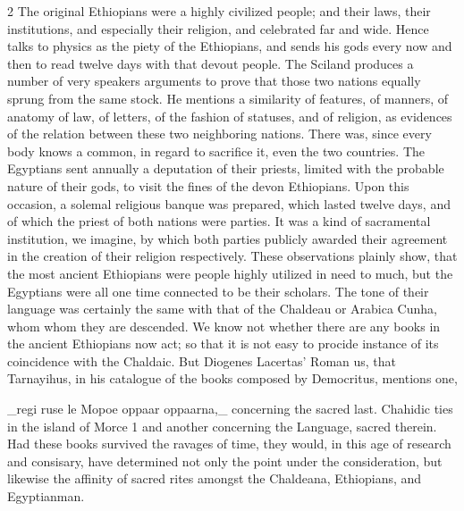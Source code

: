 \documentclass[10pt]{article}
\begin{document}
\begin{multicols}{2}
The original Ethiopians were a highly civilized people; and their laws, their institutions, and especially their religion, and celebrated far and wide. Hence talks to physics as the piety of the Ethiopians, and sends his gods every now and then to read twelve days with that devout people. The Sciland produces a number of very speakers arguments to prove that those two nations equally sprung from the same stock. He mentions a similarity of features, of manners, of anatomy of law, of letters, of the fashion of statuses, and of religion, as evidences of the relation between these two neighboring nations. There was, since every body knows a common, in regard to sacrifice it, even the two countries. The Egyptians sent annually a deputation of their priests, limited with the probable nature of their gods, to visit the fines of the devon Ethiopians. Upon this occasion, a solemal religious banque was prepared, which lasted twelve days, and of which the priest of both nations were parties. It was a kind of sacramental institution, we imagine, by which both parties publicly awarded their agreement in the creation of their religion respectively. These observations plainly show, that the most ancient Ethiopians were people highly utilized in need to much, but the Egyptians were all one time connected to be their scholars. The tone of their language was certainly the same with that of the Chaldeau or Arabica Cunha, whom whom they are descended. We know not whether there are any books in the ancient Ethiopians now act; so that it is not easy to procide instance of its coincidence with the Chaldaic. But Diogenes Lacertas’ Roman us, that Tarnayihus, in his catalogue of the books composed by Democritus, mentions one,

\_regi ruse le Mopoe oppaar oppaarna,\_ concerning the sacred last. Chahidic ties in the island of Morce 1 and another concerning the Language, sacred therein. Had these books survived the ravages of time, they would, in this age of research and consisary, have determined not only the point under the consideration, but likewise the affinity of sacred rites amongst the Chaldeana, Ethiopians, and Egyptianman.


\end{multicols}
\end{document}

